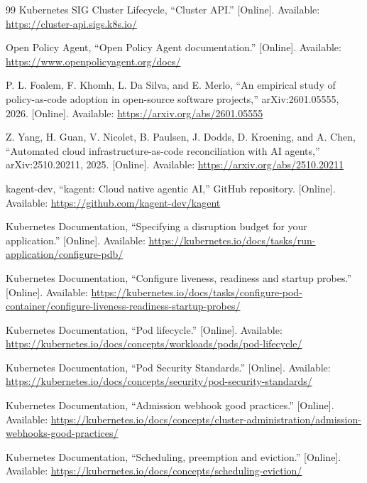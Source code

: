 \documentclass[10pt,journal]{IEEEtran}
\begin{document}
\begin{thebibliography}{99}
Kubernetes SIG Cluster Lifecycle, ``Cluster API.'' [Online]. Available: \url{https://cluster-api.sigs.k8s.io/}

Open Policy Agent, ``Open Policy Agent documentation.'' [Online]. Available: \url{https://www.openpolicyagent.org/docs/}

P. L. Foalem, F. Khomh, L. Da Silva, and E. Merlo, ``An empirical study of policy-as-code adoption in open-source software projects,'' arXiv:2601.05555, 2026. [Online]. Available: \url{https://arxiv.org/abs/2601.05555}

Z. Yang, H. Guan, V. Nicolet, B. Paulsen, J. Dodds, D. Kroening, and A. Chen, ``Automated cloud infrastructure-as-code reconciliation with AI agents,'' arXiv:2510.20211, 2025. [Online]. Available: \url{https://arxiv.org/abs/2510.20211}

kagent-dev, ``kagent: Cloud native agentic AI,'' GitHub repository. [Online]. Available: \url{https://github.com/kagent-dev/kagent}


Kubernetes Documentation, ``Specifying a disruption budget for your application.'' [Online]. Available: \url{https://kubernetes.io/docs/tasks/run-application/configure-pdb/}

Kubernetes Documentation, ``Configure liveness, readiness and startup probes.'' [Online]. Available: \url{https://kubernetes.io/docs/tasks/configure-pod-container/configure-liveness-readiness-startup-probes/}

Kubernetes Documentation, ``Pod lifecycle.'' [Online]. Available: \url{https://kubernetes.io/docs/concepts/workloads/pods/pod-lifecycle/}

Kubernetes Documentation, ``Pod Security Standards.'' [Online]. Available: \url{https://kubernetes.io/docs/concepts/security/pod-security-standards/}

Kubernetes Documentation, ``Admission webhook good practices.'' [Online]. Available: \url{https://kubernetes.io/docs/concepts/cluster-administration/admission-webhooks-good-practices/}

Kubernetes Documentation, ``Scheduling, preemption and eviction.'' [Online]. Available: \url{https://kubernetes.io/docs/concepts/scheduling-eviction/}


\end{thebibliography}
\end{document}
